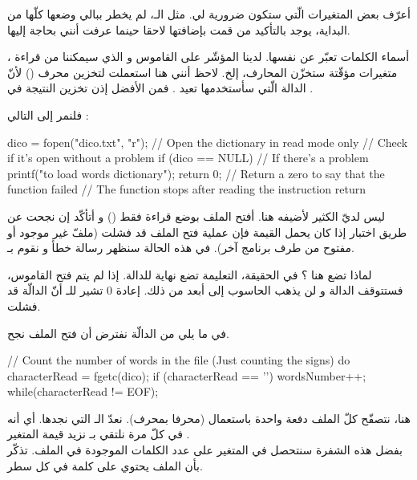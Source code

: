 أعرّف بعض المتغيرات الّتي ستكون ضرورية لي. مثل الـ،
لم يخطر ببالي وضعها كلّها من البداية، يوجد بالتأكيد من قمت بإضافتها لاحقا حينما عرفت أنني بحاجة إليها.

أسماء الكلمات تعبّر عن نفسها. لدينا المؤشّر على القاموس
و الذي سيمكننا من قراءة
،
متغيرات مؤقّتة ستخزّن المحارف، إلخ.
لاحظ أنني هنا استعملت
لتخزين محرف
()
لأنّ الدالة
الّتي سأستخدمها تعيد
.
فمن الأفضل إذن تخزين النتيجة في
.

فلنمر إلى التالي :

\begin{Csource}
dico = fopen("dico.txt", "r"); // Open the dictionary in read mode only
// Check if it's open without a problem
if (dico == NULL) // If there's a problem
{
  printf("\nImpossible to load words dictionary");
  return 0; // Return a zero to say that the function failed
  // The function stops after reading the instruction return
}
\end{Csource}

ليس لديّ الكثير لأضيفه هنا. أفتح الملف
بوضع قراءة فقط
()
و أتأكّد إن نجحت عن طريق اختبار إذا كان
يحمل القيمة
فإن عملية فتح الملف قد فشلت (ملفّ غير موجود أو مفتوح من طرف برنامج آخر). في هذه الحالة سنظهر رسالة خطأ و نقوم بـ.

لماذا تضع
هنا ؟ في الحقيقة، التعليمة
تضع نهاية للدالة. إذا لم يتم فتح القاموس، فستتوقف الدالة و لن يذهب الحاسوب إلى أبعد من ذلك. إعادة 0 تشير للـ
أنّ الدالّة قد فشلت.

في ما يلي من الدالّة نفترض أن فتح الملف نجح.

\begin{Csource}
// Count the number of words in the file (Just counting the \n signs)
do
{
  characterRead = fgetc(dico);
  if (characterRead == '\n')
    wordsNumber++;
} while(characterRead != EOF);
\end{Csource}

هنا، نتصفّح كلّ الملف دفعة واحدة باستعمال
(محرفا بمحرف). نعدّ الـ
التي نجدها. أي أنه في كلّ مرة نلتقي بـ
نزيد قيمة المتغير
.\\
بفضل هذه الشفرة سنتحصل في المتغير
على عدد الكلمات الموجودة في الملف. تذكّر بأن الملف يحتوي على كلمة في كل سطر.

